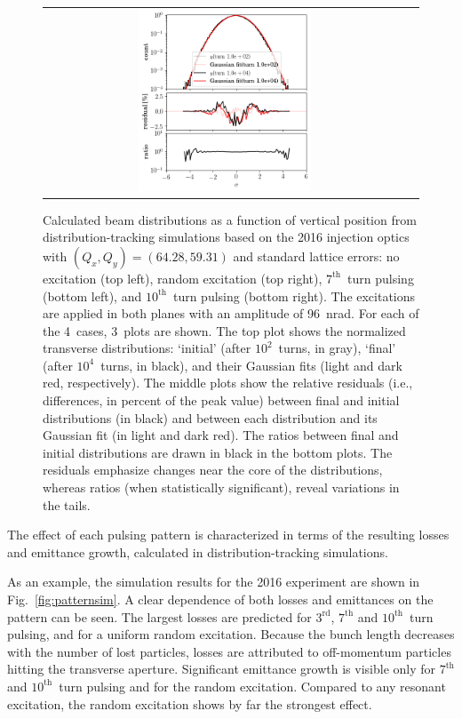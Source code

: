 \documentclass[%
 reprint,
 amsmath,amssymb,
 aps,
prstab,
longbibliography
]{revtex4-1}
\begin{document}
\begin{figure}
\begin{tabular}{cc}
    \includegraphics[width=0.49\textwidth]{2016injerra2b2u_t10skhv_3_5um_hist_y.png} \\
  \end{tabular}
  \caption{Calculated beam distributions as a function of vertical
    position from distribution-tracking simulations based on the 2016
    injection optics with $(Q_x, Q_y) = (64.28, 59.31)$ and standard
    lattice errors: no excitation (top left), random excitation (top
    right), $7^{\mathrm{th}}$~turn pulsing (bottom left), and
    $10^{\mathrm{th}}$~turn pulsing (bottom right). The excitations
    are applied in both planes with an amplitude of 96~nrad. For each
    of the 4~cases, 3~plots are shown. The top plot shows the
    normalized transverse distributions: `initial' (after
    $10^2$~turns, in gray), `final' (after $10^4$~turns, in black),
    and their Gaussian fits (light and dark red, respectively). The
    middle plots show the relative residuals (i.e., differences, in
    percent of the peak value) between final and initial distributions
    (in black) and between each distribution and its Gaussian fit (in
    light and dark red). The ratios between final and initial
    distributions are drawn in black in the bottom plots. The
    residuals emphasize changes near the core of the distributions,
    whereas ratios (when statistically significant), reveal variations
    in the tails.}
  \label{fig:patternhist}
\end{figure}


The effect of each pulsing pattern is characterized in terms of the
resulting losses and emittance growth, calculated in
distribution-tracking simulations.

As an example, the simulation results for the 2016 experiment are
shown in Fig.~\ref{fig:patternsim}.  A clear dependence of both losses
and emittances on the pattern can be seen.  The largest losses are
predicted for $3^{\mathrm{rd}}$, $7^{\mathrm{th}}$ and
$10^{\mathrm{th}}$~turn pulsing, and for a uniform random
excitation. Because the bunch length decreases with the number of lost
particles, losses are attributed to off-momentum particles hitting the
transverse aperture. Significant emittance growth is visible only for
$7^{\mathrm{th}}$ and $10^{\mathrm{th}}$~turn pulsing and for the
random excitation. Compared to any resonant excitation, the random
excitation shows by far the strongest effect.
\end{document}
